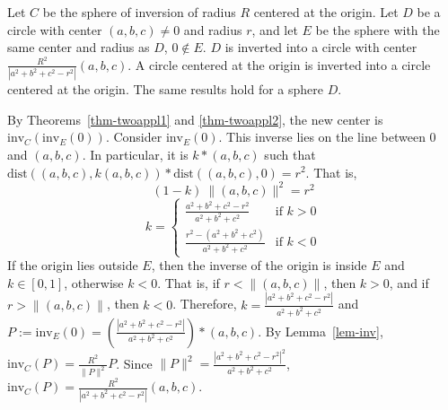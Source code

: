 \begin{lemma}
\label{lem-center}
Let $C$ be the sphere of inversion of radius $R$ centered at the origin.
Let $D$ be a circle %
with center $(a,b,c) \neq 0$ and radius $r$,
and let $E$ be the sphere with the same center and radius as $D$,
$0 \not \in E$.
$D$ is inverted into a circle with center
$\frac{R^{2}}{|a^{2} + b^{2} + c^{2} - r^{2}|} (a,b,c)$.
A circle centered at the origin is inverted into a circle centered at the 
origin.
The same results hold for a sphere $D$.
\end{lemma}
By Theorems~\ref{thm-twoappl1} and \ref{thm-twoappl2}, the new center is 
$ \mbox{inv}_{C} ( \mbox{inv}_{E} (0)) $.
Consider $\mbox{inv}_{E}(0)$.
This inverse lies on the line between $0$ and $(a,b,c)$.
In particular, it is $k * (a,b,c)$ such that 
$\mbox{dist}((a,b,c), k(a,b,c)) * \mbox{dist}((a,b,c),0) = r^{2}$.
That is, 
\[ (1-k)\ \|(a,b,c)\|^{2} = r^{2}  \]
\[ k = \left\{ \begin{array}{ll}
	\frac{a^{2} + b^{2} + c^{2} - r^{2}}{a^{2} + b^{2} + c^{2}}
	& \mbox{if $k > 0$} \\
	\frac{r^{2} - (a^{2} + b^{2} + c^{2})}{a^{2} + b^{2} + c^{2}}
	& \mbox{if $k < 0$} 
	\end{array} \right. \]
If the origin lies outside $E$, then the inverse of the origin is
inside $E$ and $k \in [0,1]$, otherwise $k < 0$.
That is, if $r < \|(a,b,c)\|$, then $k >0$, and 
if $r > \|(a,b,c)\|$, then $k < 0$.
Therefore, 
$k = \frac{|a^{2} + b^{2} + c^{2} - r^{2}|}{a^{2} + b^{2} + c^{2}}$
and $P := \mbox{inv}_{E}(0) = 
(\frac{|a^{2}+b^{2}+c^{2}-r^{2}|}{a^{2} + b^{2} + c^{2}})*(a,b,c)$.
By Lemma~\ref{lem-inv}, $\mbox{inv}_{C}(P) = \frac{R^{2}}{\|P\|^{2}} P$.
Since 
$\|P\|^{2} = \frac{|a^{2}+b^{2}+c^{2}-r^{2}|^{2}}{a^{2}+b^{2}+c^{2}}$,
$\mbox{inv}_{C}(P) = \frac{R^{2}}{|a^{2}+b^{2}+c^{2}-r^{2}|} (a,b,c)$.
\QED

